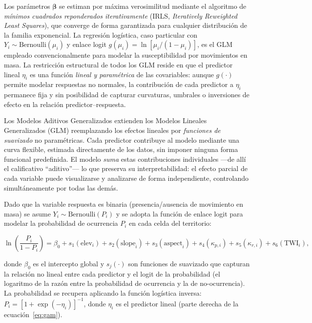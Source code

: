 \documentclass[12pt,a4paper]{article}
\begin{document}
 Los parámetros $\boldsymbol{\beta}$ se estiman por máxima
verosimilitud mediante el algoritmo de \textit{mínimos cuadrados
reponderados iterativamente} (IRLS, \textit{Iteratively Reweighted
Least Squares}), que converge de forma garantizada para cualquier
distribución de la familia exponencial. La regresión logística, caso
particular con $Y_i \sim \mathrm{Bernoulli}(\mu_i)$ y enlace logit
$g(\mu_i) = \ln[\mu_i/(1-\mu_i)]$, es el GLM empleado
convencionalmente para modelar la susceptibilidad por movimientos en
masa. La restricción estructural de todos los GLM reside en que el
predictor lineal $\eta_i$ es una función \emph{lineal y paramétrica}
de las covariables: aunque $g(\cdot)$ permite modelar respuestas no
normales, la contribución de cada predictor a $\eta_i$ permanece fija
y sin posibilidad de capturar curvaturas, umbrales o inversiones de
efecto en la relación predictor--respuesta.

Los Modelos Aditivos Generalizados
\citep{hastie1990generalized, wood2017generalized} extienden los
Modelos Lineales Generalizados (GLM) reemplazando los efectos lineales por
\textit{funciones de suavizado} no paramétricas. Cada predictor contribuye
al modelo mediante una curva flexible, estimada directamente de los datos,
sin imponer ninguna forma funcional predefinida. El modelo \textit{suma}
estas contribuciones individuales ---de allí el calificativo
``aditivo''--- lo que preserva su interpretabilidad: el efecto parcial de
cada variable puede visualizarse y analizarse de forma independiente,
controlando simultáneamente por todas las demás.

Dado que la variable respuesta es binaria (presencia/ausencia de
movimiento en masa) se asume $Y_i \sim \mathrm{Bernoulli}(P_i)$ y se
adopta la función de enlace logit para modelar la probabilidad de
ocurrencia $P_i$ en cada celda del territorio:

\begin{equation}
\ln\!\left(\frac{P_i}{1-P_i}\right) = \beta_0 +
s_1(\mathrm{elev}_i) + s_2(\mathrm{slope}_i) +
s_3(\mathrm{aspect}_i) + s_4(\kappa_{p,i}) +
s_5(\kappa_{r,i}) + s_6(\mathrm{TWI}_i),
\label{eq:gam}
\end{equation}

donde $\beta_0$ es el intercepto global y $s_j(\cdot)$ son funciones
de suavizado que capturan la relación no lineal entre cada predictor y
el logit de la probabilidad (el logaritmo de la razón entre la
probabilidad de ocurrencia y la de no-ocurrencia). La probabilidad se
recupera aplicando la función logística inversa:
$P_i = [1 + \exp(-\eta_i)]^{-1}$, donde $\eta_i$ es el predictor
lineal (parte derecha de la ecuación~\eqref{eq:gam}).
\end{document}
